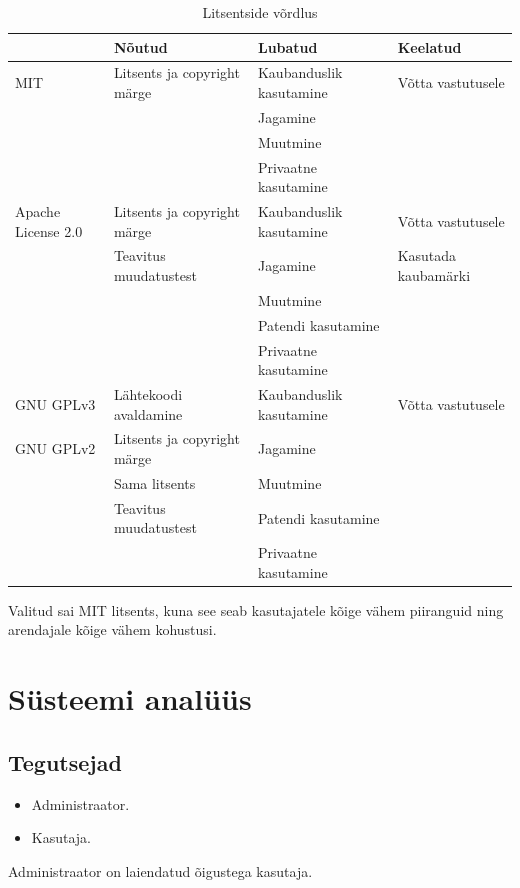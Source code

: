 \documentclass[a4paper,12pt]{article} %
\begin{document}
\begin{table}[H]%
\begin{center}
\caption{Litsentside võrdlus}
\label{table_litsentside_vordlus}
\begin{tabular}{|p{3cm}|p{4cm}|p{4cm}|p{4cm}|}
\hline
\rowcolor{rowgray}
 & Nõutud & Lubatud & Keelatud \\ \hline
MIT & Litsents ja copyright märge & Kaubanduslik kasutamine & Võtta vastutusele \\
 &  & Jagamine &  \\
 &  & Muutmine &  \\
 &  & Privaatne kasutamine &  \\ \hline
Apache \newline License 2.0 & Litsents ja copyright märge & Kaubanduslik kasutamine & Võtta vastutusele \\
 & Teavitus muudatustest & Jagamine & Kasutada kaubamärki \\
 &  & Muutmine &  \\
 &  & Patendi kasutamine &  \\
 &  & Privaatne kasutamine &  \\ \hline
GNU GPLv3 & Lähtekoodi avaldamine & Kaubanduslik kasutamine & Võtta vastutusele \\
GNU GPLv2 & Litsents ja copyright märge & Jagamine &  \\
 & Sama litsents & Muutmine &  \\
 & Teavitus muudatustest & Patendi kasutamine &  \\
 &  & Privaatne kasutamine & \\ \hline
\end{tabular}
\cite{Licences}
\end{center}
\end{table}
Valitud sai MIT litsents, kuna see seab kasutajatele kõige vähem piiranguid ning arendajale kõige vähem kohustusi.
\section{Süsteemi analüüs}
\subsection{Tegutsejad}
\begin{itemize}
\item Administraator.
\item Kasutaja.
\end{itemize}
Administraator on laiendatud õigustega kasutaja.
\end{document}
